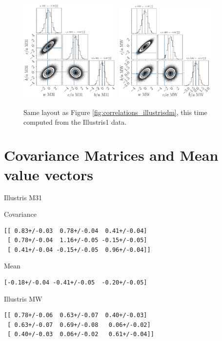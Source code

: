 \documentclass[a4paper,fleqn,usenatbib]{mnras}
\begin{document}
\begin{figure}
\centering
\includegraphics[width=0.45\textwidth]{gaussian_model_illustris_M31.pdf}
\includegraphics[width=0.45\textwidth]{gaussian_model_illustris_MW.pdf}
\caption{
Same layout as Figure \ref{fig:correlations_illustrisdm}, this time
computed from the Illustris1 data.
\label{fig:correlations_illustris}}
\end{figure}



\section{Covariance Matrices and Mean value vectors}
Illustris M31

Covariance
\begin{verbatim}
[[ 0.83+/-0.03  0.78+/-0.04  0.41+/-0.04]
 [ 0.78+/-0.04  1.16+/-0.05 -0.15+/-0.05]
 [ 0.41+/-0.04 -0.15+/-0.05  0.96+/-0.04]]
\end{verbatim}

Mean

\begin{verbatim}
[-0.18+/-0.04 -0.41+/-0.05  -0.20+/-0.05]
\end{verbatim}

Illustris MW
\begin{verbatim}
[[ 0.78+/-0.06  0.63+/-0.07  0.40+/-0.03]
 [ 0.63+/-0.07  0.69+/-0.08   0.06+/-0.02]
 [ 0.40+/-0.03  0.06+/-0.02   0.61+/-0.04]]
\end{verbatim} 
\end{document}
